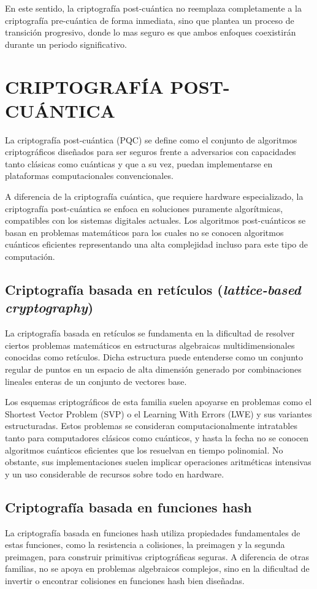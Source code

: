 En este sentido, la criptografía post-cuántica no reemplaza completamente a la criptografía pre-cuántica de forma inmediata, sino que plantea un proceso de transición progresivo, donde lo mas seguro es que ambos enfoques coexistirán durante un periodo significativo.

\section{CRIPTOGRAFÍA POST-CUÁNTICA}
La criptografía post-cuántica (PQC) se define como el conjunto de algoritmos criptográficos diseñados para ser seguros frente a adversarios con capacidades tanto clásicas como cuánticas y que a su vez, puedan implementarse en plataformas computacionales convencionales.

A diferencia de la criptografía cuántica, que requiere hardware especializado, la criptografía post-cuántica se enfoca en soluciones puramente algorítmicas, compatibles con los sistemas digitales actuales. Los algoritmos post-cuánticos se basan en problemas matemáticos para los cuales no se conocen algoritmos cuánticos eficientes representando una alta complejidad incluso para este tipo de computación.

\subsection{Criptografía basada en retículos (\textit{lattice-based cryptography})}
La criptografía basada en retículos se fundamenta en la dificultad de resolver ciertos problemas matemáticos en estructuras algebraicas multidimensionales conocidas como retículos. Dicha estructura puede entenderse como un conjunto regular de puntos en un espacio de alta dimensión generado por combinaciones lineales enteras de un conjunto de vectores base.

Los esquemas criptográficos de esta familia suelen apoyarse en problemas como el Shortest Vector Problem (SVP) o el Learning With Errors (LWE) y sus variantes estructuradas. Estos problemas se consideran computacionalmente intratables tanto para computadores clásicos como cuánticos, y hasta la fecha no se conocen algoritmos cuánticos eficientes que los resuelvan en tiempo polinomial. No obstante, sus implementaciones suelen implicar operaciones aritméticas intensivas y un uso considerable de recursos sobre todo en hardware.

\subsection{Criptografía basada en funciones hash}
La criptografía basada en funciones hash utiliza propiedades fundamentales de estas funciones, como la resistencia a colisiones, la preimagen y la segunda preimagen, para construir primitivas criptográficas seguras. A diferencia de otras familias, no se apoya en problemas algebraicos complejos, sino en la dificultad de invertir o encontrar colisiones en funciones hash bien diseñadas.

